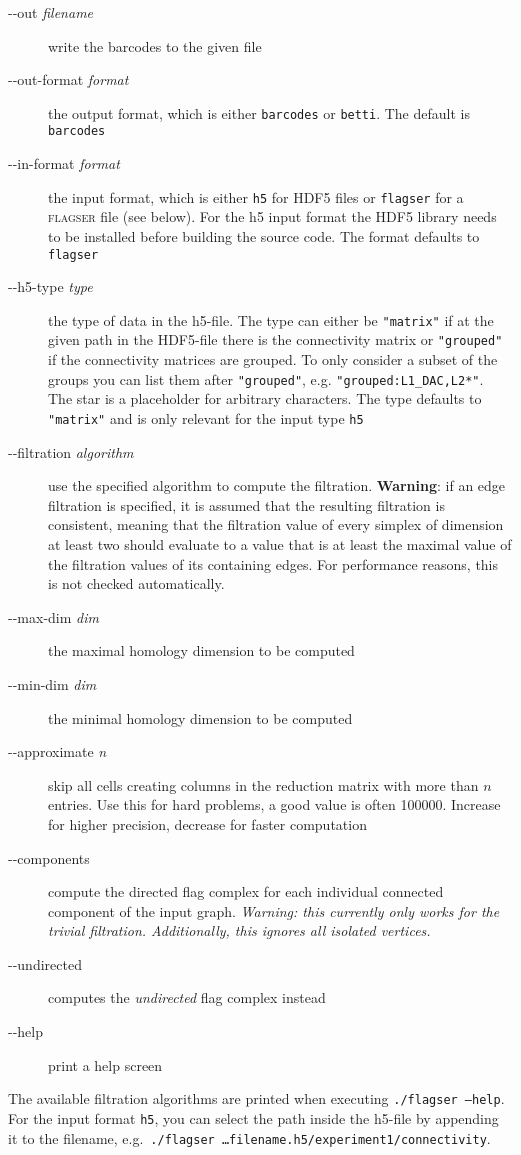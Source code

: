 \documentclass{amsart}
\theoremstyle{definition}
\begin{document}
\enlargethispage{\baselineskip}
\begin{description}
  \item [-{}-out \textit{filename}] write the barcodes to the given file
  \item [-{}-out-format \textit{format}] the output format, which is either \texttt{barcodes} or
    \texttt{betti}. The default is \texttt{barcodes}
  \item [-{}-in-format \textit{format}] the input format, which is either \texttt{h5} for HDF5 files
    or \texttt{flagser} for a \textsc{flagser} file (see below). For the h5 input format the HDF5
    library needs to be installed before building the source code. The format defaults to
    \texttt{flagser}
  \item [-{}-h5-type \textit{type}] the type of data in the h5-file. The type can either be
    \texttt{"matrix"} if at the given path in the HDF5-file there is the connectivity matrix or \texttt{"grouped"}
    if the connectivity matrices are grouped. To only consider a subset of the groups you can list
    them after \texttt{"grouped"}, e.g. \texttt{"grouped:L1\_DAC,L2*"}. The star is a placeholder for
    arbitrary characters. The type defaults to \texttt{"matrix"} and is only relevant for the input
    type \texttt{h5}
  \item [-{}-filtration \textit{algorithm}] use the specified algorithm to compute the filtration. \textbf{Warning}:
  if an edge filtration is specified, it is assumed that the resulting filtration is consistent, meaning that the
  filtration value of every simplex of dimension at least two should evaluate to a value that is at least the
  maximal value of the filtration values of its containing edges. For performance reasons, this is not checked
  automatically.
  \item [-{}-max-dim \textit{dim}] the maximal homology dimension to be computed
  \item [-{}-min-dim \textit{dim}] the minimal homology dimension to be computed
  \item [-{}-approximate \textit{n}] skip all cells creating columns in the reduction matrix with
    more than $n$ entries. Use this for hard problems, a good value is often 100000. Increase for
    higher precision, decrease for faster computation
  \item [-{}-components] compute the directed flag complex for each individual connected
    component of the input graph. \emph{Warning: this currently only works for the trivial
    filtration. Additionally, this ignores all isolated vertices.}
  \item [-{}-undirected] computes the \emph{undirected} flag complex instead
  \item [-{}-help] print a help screen
\end{description}
The available filtration algorithms are printed when executing \texttt{./flagser --help}.
For the input format \texttt{h5}, you can select the path inside the h5-file by appending it to the
filename, e.g.\ \texttt{./flagser \ldots filename.h5/experiment1/connectivity}.
\end{document}
